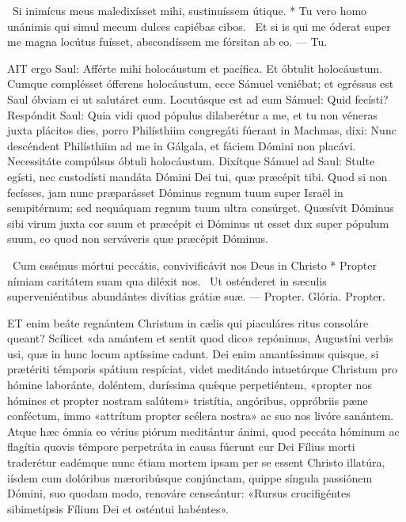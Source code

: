 \R\ Si inimícus meus maledixísset mihi, sustinuíssem útique. * Tu vero homo unánimis qui simul mecum dulces capiébas cibos. \V\ Et si is qui me óderat super me magna locútus fuísset, abscondíssem me fórsitan ab eo. --- Tu.


\lettrine[lines=2]{A}{IT} ergo Saul: Afférte mihi holocáustum et pacífica. Et óbtulit holocáustum. Cumque complésset ófferens holocáustum, ecce Sámuel veniébat; et egréssus est Saul óbviam ei ut salutáret eum. Locutúsque est ad eum Sámuel: Quid fecísti? Respóndit Saul: Quia vidi quod pópulus dilaberétur a me, et tu non véneras juxta plácitos dies, porro Philísthiim congregáti fúerant in Machmas, dixi: Nunc descéndent Philísthiim ad me in Gálgala, et fáciem Dómini non placávi. Necessitáte compúlsus óbtuli holocáustum. Dixítque Sámuel ad Saul: Stulte egísti, nec custodísti mandáta Dómini Dei tui, quæ præcépit tibi. Quod si non fecísses, jam nunc præparásset Dóminus regnum tuum super Israël in sempitérnum; sed nequáquam regnum tuum ultra consúrget. Quæsívit Dóminus sibi virum juxta cor suum et præcépit ei Dóminus ut esset dux super pópulum suum, eo quod non serváveris quæ præcépit Dóminus.

\R\ Cum essémus mórtui peccátis, convivificávit nos Deus in Christo * Propter nímiam caritátem suam qua diléxit nos. \V\ Ut osténderet in sæculis superveniéntibus abundántes divítias grátiæ suæ. --- Propter. Glória. Propter.




\lettrine[lines=2]{E}{T} enim beáte regnántem Christum in cælis qui piaculáres ritus consoláre queant? Scílicet «da amántem et sentit quod dico» repónimus, Augustíni verbis usi, quæ in hunc locum aptíssime cadunt. Dei enim amantíssimus quisque, si prætériti témporis spátium respíciat, videt meditándo intuetúrque Christum pro hómine laboránte, doléntem, duríssima quǽque perpetiéntem, «propter nos hómines et propter nostram salútem» tristítia, angóribus, oppróbriis pæne conféctum, immo «attrítum propter scélera nostra» ac suo nos livóre sanántem. Atque hæc ómnia eo vérius piórum meditántur ánimi, quod peccáta hóminum ac flagítia quovis témpore perpetráta in causa fúerunt cur Dei Fílius morti traderétur eadémque nunc étiam mortem ipsam per se essent Christo illatúra, iísdem cum dolóribus mæroribúsque conjúnctam, quippe síngula passiónem Dómini, suo quodam modo, renováre censeántur: «Rursus crucifigéntes sibimetípsis Fílium Dei et osténtui habéntes».

